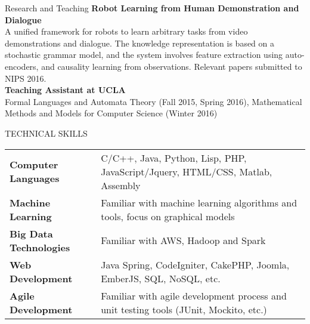 \documentclass{resume} %
\begin{document}

\begin{rSection}{Research and Teaching}
\textbf{Robot Learning from Human Demonstration and Dialogue}\\
A unified framework for robots to learn arbitrary tasks from video demonstrations and dialogue. The knowledge representation is based on a stochastic grammar model, and the system involves feature extraction using auto-encoders, and causality learning from observations. Relevant papers submitted to NIPS 2016.\\
\textbf{Teaching Assistant at UCLA}\\  
Formal Languages and Automata Theory (Fall 2015, Spring 2016), Mathematical Methods and Models for Computer Science (Winter 2016)
\end{rSection}



\begin{rSection}{TECHNICAL SKILLS}

\begin{tabular}{ @{} >{\bfseries}l @{\hspace{6ex}} l }
Computer Languages & C/C++, Java, Python, Lisp, PHP, JavaScript/Jquery, HTML/CSS, Matlab, Assembly \\
Machine Learning & Familiar with machine learning algorithms and tools, focus on graphical models \\
Big Data Technologies & Familiar with AWS, Hadoop and Spark \\
Web Development & Java Spring, CodeIgniter, CakePHP, Joomla, EmberJS, SQL, NoSQL, etc. \\
Agile Development & Familiar with agile development process and unit testing tools (JUnit, Mockito, etc.) \\
\end{tabular}
\end {rSection}


\end{document}
